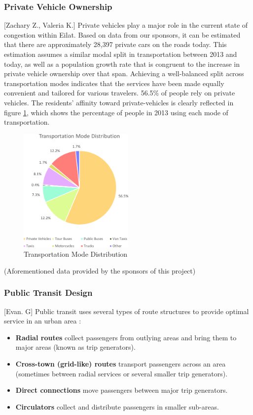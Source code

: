 \documentclass[12pt]{article}                               %
\begin{document}
\subsubsection{Private Vehicle Ownership}[Zachary Z., Valeria K.]
Private vehicles play a major role in the current state of congestion within Eilat. Based on data from our sponsors, it can be estimated that there are approximately 28,397 private cars on the roads today. This estimation assumes a similar modal split in transportation between 2013 and today, as well as a population growth rate that is congruent to the increase in private vehicle ownership over that span. Achieving a well-balanced split across transportation modes indicates that the services have been made equally convenient and tailored for various travelers. 56.5\% of people rely on private vehicles. The residents' affinity toward private-vehicles is clearly reflected in figure \ref{img:transportation_modal_split}, which shows the percentage of people in 2013 using each mode of transportation.

\begin{figure}[H]
    \centering
    \includegraphics[width=0.5\textwidth]{images/transportation_distribution.png}
    \caption{Transportation Mode Distribution}
    \label{img:transportation_modal_split}
\end{figure}

(Aforementioned data provided by the sponsors of this project)

\subsubsection{Public Transit Design}[Evan. G]
Public transit uses several types of route structures to provide optimal service in an urban area \cite{Fielbaum2016OptimalStructure, WikiBooksFundamentalsWorld}:
\begin{itemize}
    \item \textbf{Radial routes} collect passengers from outlying areas and bring them to major areas (known as trip generators).
    \item \textbf{Cross-town (grid-like) routes} transport passengers across an area (sometimes between radial services or several smaller trip generators).
    \item \textbf{Direct connections} move passengers between major trip generators.
    \item \textbf{Circulators} collect and distribute passengers in smaller sub-areas.
\end{itemize}
\end{document}
